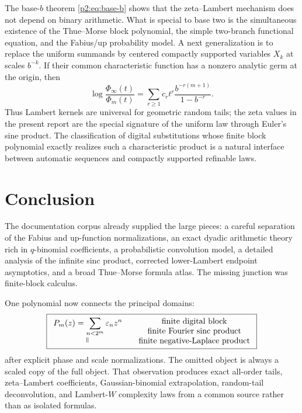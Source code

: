 \documentclass[11pt,oneside]{article}
\numberwithin{equation}{section}
\theoremstyle{definition}
\theoremstyle{remark}
\newcommand{\eps}{\varepsilon}
\begin{document}
The base-$b$ theorem \eqref{p2:eq:base-b} shows that the zeta--Lambert mechanism does not depend
on binary arithmetic.  What is special to base two is the simultaneous existence of the
Thue--Morse block polynomial, the simple two-branch functional equation, and the Fabius/up
probability model.  A next generalization is to replace the uniform summands by centered
compactly supported variables $X_k$ at scales $b^{-k}$.  If their common characteristic
function has a nonzero analytic germ at the origin, then
\[
 \log\frac{\Phi_\infty(t)}{\Phi_m(t)}
 =\sum_{r\ge1}c_r t^r\frac{b^{-r(m+1)}}{1-b^{-r}}.
\]
Thus Lambert kernels are universal for geometric random tails; the zeta values in the present
report are the special signature of the uniform law through Euler's sine product.  The
classification of digital substitutions whose finite block polynomial exactly realizes such
a characteristic product is a natural interface between automatic sequences and compactly
supported refinable laws.

\section{Conclusion}
\label{p2:sec:conclusion}

The documentation corpus already supplied the large pieces: a careful separation of the
Fabius and up-function normalizations, an exact dyadic arithmetic theory rich in
$q$-binomial coefficients, a probabilistic convolution model, a detailed analysis of the
infinite sinc product, corrected lower-Lambert endpoint asymptotics, and a broad Thue--Morse
formula atlas.  The missing junction was finite-block calculus.

One polynomial now connects the principal domains:
\[
 \boxed{
 \begin{array}{c}
 P_m(z)=\displaystyle\sum_{n<2^m}\eps_nz^n\\[0.3em]
 \rotatebox{90}{$=$}
 \end{array}
 \quad
 \begin{array}{c}
 \text{finite digital block}\\
 \text{finite Fourier sinc product}\\
 \text{finite negative-Laplace product}
 \end{array}}
\]
after explicit phase and scale normalizations.  The omitted object is always a scaled copy of
the full object.  That observation produces exact all-order tails, zeta--Lambert coefficients,
Gaussian-binomial extrapolation, random-tail deconvolution, and Lambert-$W$ complexity laws
from a common source rather than as isolated formulas.
\end{document}
